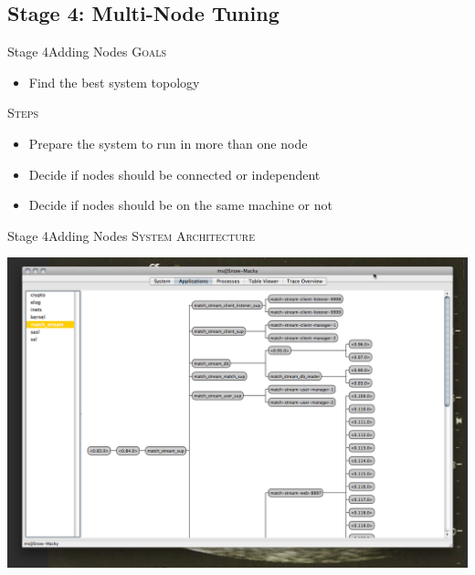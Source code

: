 \documentclass[utf8]{beamer}
\begin{document}
\subsection{Stage 4: Multi-Node Tuning}
\begin{frame}{Stage 4}{Adding Nodes}
	\textsc{Goals}
	\begin{itemize}
		\item Find the best system topology
	\end{itemize}
	\pause
	\textsc{Steps}
	\begin{itemize}
		\item Prepare the system to run in more than one node
		\item Decide if nodes should be connected or independent
		\item Decide if nodes should be on the same machine or not
	\end{itemize}
\end{frame}
\begin{frame}{Stage 4}{Adding Nodes}
	\textsc{System Architecture}
	\begin{center}
		\includegraphics[height=.75\textheight]{img/running-late.png}
	\end{center}
\end{frame}
\end{document}
